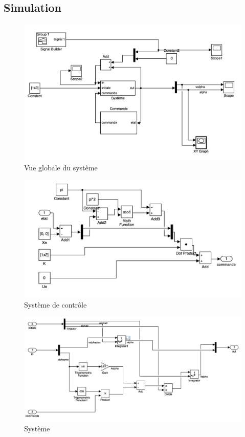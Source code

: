 \documentclass[11pt]{article}
\begin{document}
\subsection{Simulation}
\begin{figure}[h!]
	\includegraphics[scale=0.3]{images/pendule_inverse_1}
	\caption{Vue globale du système}
\end{figure}
\begin{figure}[h!]
	\includegraphics[scale=0.3]{images/pendule_inverse_2}
	\caption{Système de contrôle}
\end{figure}
\begin{figure}[h!]
	\includegraphics[scale=0.28]{images/pendule_inverse_3}
	\caption{Système}
\end{figure}
\end{document}
